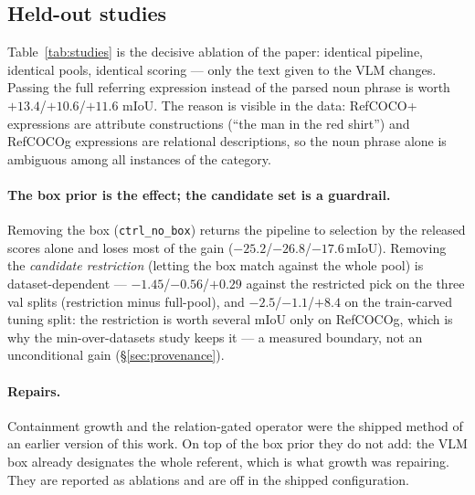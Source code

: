 \begin{table}[t]\centering\small
\caption{gRefCOCO after the term-alignment correction (full official val,
$n{=}14{,}229$, a single frozen application per row). The training-free rule is
the shipped row; the declared-trained transfer recipe is reported below it and
is not shipped. The supervised reference (InstAlign) is a labelled row, never
a floor.}
\label{tab:learned}

\end{table}

\subsection{Held-out studies}
\label{sec:studies}
Table~\ref{tab:studies} is the decisive ablation of the paper: identical
pipeline, identical pools, identical scoring --- only the text given to the
VLM changes. Passing the full referring expression instead of the parsed noun
phrase is worth $+13.4$/$+10.6$/$+11.6$ mIoU. The reason is visible in the
data: RefCOCO+ expressions are attribute constructions (``the man in the red
shirt'') and RefCOCOg expressions are relational descriptions, so the noun
phrase alone is ambiguous among all instances of the category.

\begin{table}[t]\centering\small
\caption{Box-prompt study, held-out split (train refs), best of
\studyTrials{} Optuna trials each.}\label{tab:studies}

\end{table}


\paragraph{The box prior is the effect; the candidate set is a guardrail.}
Removing the box (\texttt{ctrl\_no\_box}) returns the pipeline to selection by
the released scores alone and loses most of the gain
($-25.2$/$-26.8$/$-17.6$\,mIoU). Removing the \emph{candidate restriction}
(letting the box match against the whole pool) is dataset-dependent ---
$-1.45$/$-0.56$/$+0.29$ against the restricted pick on the three val splits
(restriction minus full-pool), and $-2.5$/$-1.1$/$+8.4$ on the train-carved
tuning split: the restriction is worth several mIoU only on RefCOCOg, which is
why the min-over-datasets study keeps it --- a measured boundary, not an
unconditional gain (\S\ref{sec:provenance}).

\paragraph{Repairs.} Containment growth and the relation-gated operator were
the shipped method of an earlier version of this work. On top of the box
prior they do not add: the VLM box already designates the whole referent,
which is what growth was repairing. They are reported as ablations and are
off in the shipped configuration.

